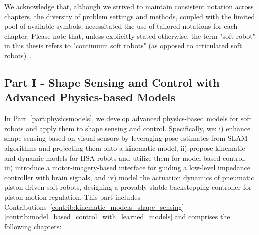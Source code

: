 We acknowledge that, although we strived to maintain consistent notation across chapters, the diversity of problem settings and methods, coupled with the limited pool of available symbols, necessitated the use of tailored notations for each chapter.
Please note that, unless explicitly stated otherwise, the term "soft robot" in this thesis refers to "continuum soft robots" (as opposed to articulated soft robots)~\cite{della2020softencyclopedia}.

\subsection*{Part I - Shape Sensing and Control with Advanced Physics-based Models}

In Part~\ref{part:physicsmodels}, we develop advanced physics-based models for soft robots and apply them to shape sensing and control. Specifically, we: i) enhance shape sensing based on visual sensors by leveraging pose estimates from \gls{SLAM} algorithms and projecting them onto a kinematic model, ii) propose kinematic and dynamic models for \gls{HSA} robots and utilize them for model-based control, iii) introduce a motor-imagery-based  interface for guiding a low-level impedance controller with brain signals, and iv) model the actuation dynamics of pneumatic piston-driven soft robots, designing a provably stable backstepping controller for piston motion regulation.
%
This part includes Contributions~\ref{contrib:kinematic_models_shape_sensing}-\ref{contrib:model_based_control_with_learned_models} and comprises the following chapters:

